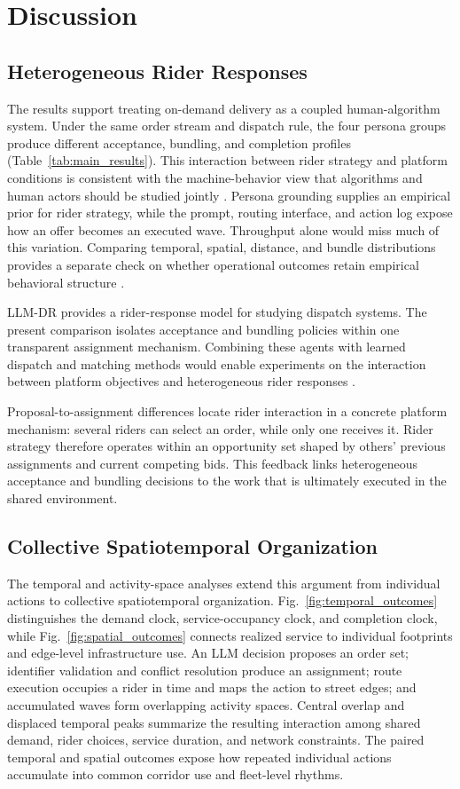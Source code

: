 \documentclass[letterpaper,journal]{IEEEtran}
\begin{document}
\section{Discussion}
\subsection{Heterogeneous Rider Responses}
The results support treating on-demand delivery as a coupled human-algorithm system. Under the same order stream and dispatch rule, the four persona groups produce different acceptance, bundling, and completion profiles (Table~\ref{tab:main_results}). This interaction between rider strategy and platform conditions is consistent with the machine-behavior view that algorithms and human actors should be studied jointly \cite{rahwanMachineBehaviour2019}. Persona grounding supplies an empirical prior for rider strategy, while the prompt, routing interface, and action log expose how an offer becomes an executed wave. Throughput alone would miss much of this variation. Comparing temporal, spatial, distance, and bundle distributions provides a separate check on whether operational outcomes retain empirical behavioral structure \cite{hofmanIntegratingExplanationPrediction2021}.

LLM-DR provides a rider-response model for studying dispatch systems. The present comparison isolates acceptance and bundling policies within one transparent assignment mechanism. Combining these agents with learned dispatch and matching methods would enable experiments on the interaction between platform objectives and heterogeneous rider responses \cite{chenImitationLearningEnhanced2022,chenOrderDispatchingGNN2024}.

Proposal-to-assignment differences locate rider interaction in a concrete platform mechanism: several riders can select an order, while only one receives it. Rider strategy therefore operates within an opportunity set shaped by others' previous assignments and current competing bids. This feedback links heterogeneous acceptance and bundling decisions to the work that is ultimately executed in the shared environment.

\subsection{Collective Spatiotemporal Organization}
The temporal and activity-space analyses extend this argument from individual actions to collective spatiotemporal organization. Fig.~\ref{fig:temporal_outcomes} distinguishes the demand clock, service-occupancy clock, and completion clock, while Fig.~\ref{fig:spatial_outcomes} connects realized service to individual footprints and edge-level infrastructure use. An LLM decision proposes an order set; identifier validation and conflict resolution produce an assignment; route execution occupies a rider in time and maps the action to street edges; and accumulated waves form overlapping activity spaces. Central overlap and displaced temporal peaks summarize the resulting interaction among shared demand, rider choices, service duration, and network constraints. The paired temporal and spatial outcomes expose how repeated individual actions accumulate into common corridor use and fleet-level rhythms.
\end{document}
